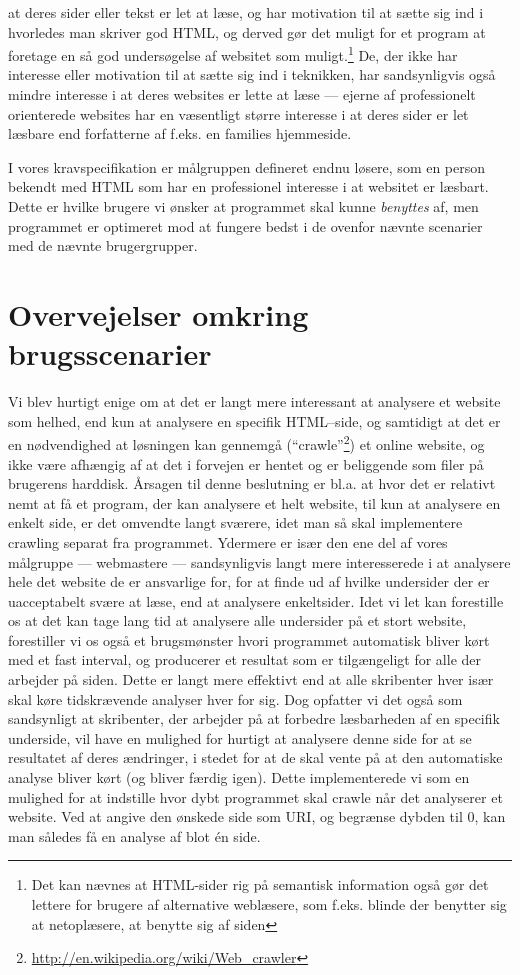 \documentclass[a4paper,oneside]{memoir}
\begin{document}
at deres sider eller tekst er let at læse, og har motivation til at
sætte sig ind i hvorledes man skriver god HTML, og derved gør det
muligt for et program at foretage en så god undersøgelse af websitet
som muligt.\footnote{Det kan nævnes at HTML-sider rig på semantisk
  information også gør det lettere for brugere af alternative
  weblæsere, som f.eks. blinde der benytter sig at netoplæsere, at
  benytte sig af siden} De, der ikke har interesse eller motivation
til at sætte sig ind i teknikken, har sandsynligvis også mindre
interesse i at deres websites er lette at læse --- ejerne af
professionelt orienterede websites har en væsentligt større interesse
i at deres sider er let læsbare end forfatterne af f.eks. en families
hjemmeside.

I vores kravspecifikation er målgruppen defineret endnu løsere, som en
person bekendt med HTML som har en professionel interesse i at
websitet er læsbart. Dette er hvilke brugere vi ønsker at programmet
skal kunne \textit{benyttes} af, men programmet er optimeret mod at
fungere bedst i de ovenfor nævnte scenarier med de nævnte
brugergrupper.

\section{Overvejelser omkring brugsscenarier}
\label{brugsovervejelser}
Vi blev hurtigt enige om at det er langt mere interessant at analysere
et website som helhed, end kun at analysere en specifik HTML--side, og
samtidigt at det er en nødvendighed at løsningen kan gennemgå
(``crawle''\footnote{\url{http://en.wikipedia.org/wiki/Web_crawler}})
et online website, og ikke være afhængig af at det i forvejen er
hentet og er beliggende som filer på brugerens harddisk. Årsagen til
denne beslutning er bl.a. at hvor det er relativt nemt at få et
program, der kan analysere et helt website, til kun at analysere en
enkelt side, er det omvendte langt sværere, idet man så skal
implementere crawling separat fra programmet. Ydermere er især den ene
del af vores målgruppe --- webmastere --- sandsynligvis langt mere
interesserede i at analysere hele det website de er ansvarlige for,
for at finde ud af hvilke undersider der er uacceptabelt svære at
læse, end at analysere enkeltsider. Idet vi let kan forestille os at
det kan tage lang tid at analysere alle undersider på et stort
website, forestiller vi os også et brugsmønster hvori programmet
automatisk bliver kørt med et fast interval, og producerer et resultat
som er tilgængeligt for alle der arbejder på siden. Dette er langt
mere effektivt end at alle skribenter hver især skal køre tidskrævende
analyser hver for sig. Dog opfatter vi det også som sandsynligt at
skribenter, der arbejder på at forbedre læsbarheden af en specifik
underside, vil have en mulighed for hurtigt at analysere denne side
for at se resultatet af deres ændringer, i stedet for at de skal vente
på at den automatiske analyse bliver kørt (og bliver færdig
igen). Dette implementerede vi som en mulighed for at indstille hvor
dybt programmet skal crawle når det analyserer et website. Ved at
angive den ønskede side som URI, og begrænse dybden til 0, kan man
således få en analyse af blot én side.
\end{document}
